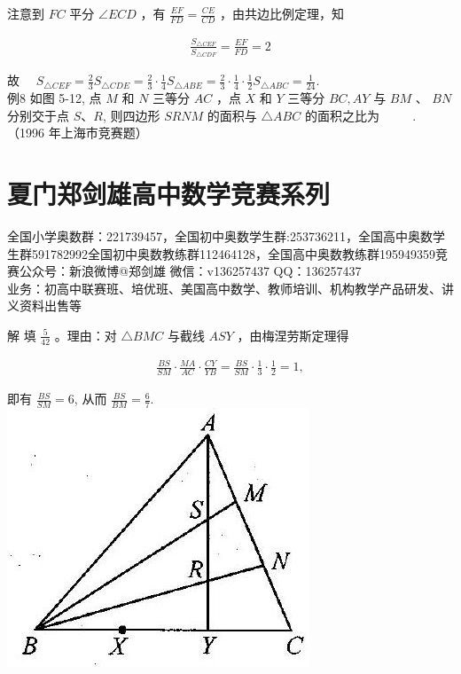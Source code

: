 \documentclass[10pt]{article}
\begin{document}
注意到 $F C$ 平分 $\angle E C D$ ，有 $\frac{E F}{F D}=\frac{C E}{C D}$ ，由共边比例定理，知

\begin{align*}
\frac{S_{\triangle C E F}}{S_{\triangle C D F}}=\frac{E F}{F D}=2
\end{align*}

故 $\quad S_{\triangle C E F}=\frac{2}{3} S_{\triangle C D E}=\frac{2}{3} \cdot \frac{1}{4} S_{\triangle A B E}=\frac{2}{3} \cdot \frac{1}{4} \cdot \frac{1}{2} S_{\triangle A B C}=\frac{1}{24}$.\\
例8 如图 5-12, 点 $M$ 和 $N$ 三等分 $A C$ ，点 $X$ 和 $Y$ 三等分 $B C, A Y$ 与 $B M$ 、 $B N$ 分别交于点 $S 、 R$, 则四边形 $S R N M$ 的面积与 $\triangle A B C$ 的面积之比为 $\qquad$ . （1996 年上海市竞赛题）

\section*{夏门郑剑雄高中数学竞赛系列}
全国小学奥数群：221739457，全国初中奥数学生群:253736211，全国高中奥数学生群591782992全国初中奥数教练群112464128，全国高中奥数教练群195949359竞赛公众号：新浪微博@郑剑雄 微信：v136257437 QQ：136257437\\
业务：初高中联赛班、培优班、美国高中数学、教师培训、机构教学产品研发、讲义资料出售等

解 填 $\frac{5}{42}$ 。理由：对 $\triangle B M C$ 与截线 $A S Y$ ，由梅涅劳斯定理得

\begin{align*}
\frac{B S}{S M} \cdot \frac{M A}{A C} \cdot \frac{C Y}{Y B}=\frac{B S}{S M} \cdot \frac{1}{3} \cdot \frac{1}{2}=1,
\end{align*}

即有 $\frac{B S}{S M}=6$, 从而 $\frac{B S}{B M}=\frac{6}{7}$.\\
\includegraphics[max width=\textwidth, center]{2024_10_30_2c8f45efd4a519b08e1ag-054}
\end{document}
